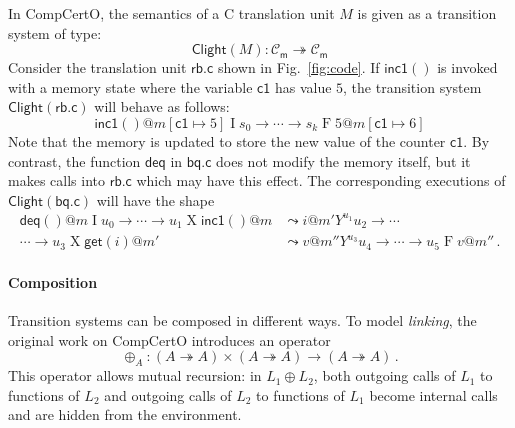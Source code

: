\documentclass[acmsmall,screen,review,anonymous]{acmart}
\newcommand{\kw}[1]{\ensuremath{ \mathsf{#1} }}
\begin{document}
\begin{example} \label{ex:clightsem} %
In CompCertO,
the semantics of a C translation unit $M$
is given as a transition system of type:
\[
  \kw{Clight}(M) : \mathcal{C}_\kw{m} \twoheadrightarrow \mathcal{C}_\kw{m}
\]
%
Consider the translation unit $\kw{rb.c}$ shown in Fig.~\ref{fig:code}.
If $\kw{inc1}()$ is invoked
with a memory state where the variable $\kw{c1}$ has value $5$,
the transition system $\kw{Clight}(\kw{rb.c})$ will behave as follows:
\[
  \kw{inc1}()@m[\kw{c1} \mapsto 5]
  \mathrel{I}
  s_0 \rightarrow \cdots \rightarrow s_k
  \mathrel{F}
  5@m[\kw{c1} \mapsto 6]
\]
Note that the memory is updated to store the new value of the counter $\kw{c1}$.
By contrast, the function $\kw{deq}$ in $\kw{bq.c}$
does not modify the memory itself,
but it makes calls into $\kw{rb.c}$ which may have this effect.
The corresponding executions of $\kw{Clight}(\kw{bq.c})$
will have the shape
\begin{align*}
  \kw{deq}()@m
  \mathrel{I}
  u_0 \rightarrow \cdots \rightarrow u_1
  \mathrel{X}
  \kw{inc1}()@m &\leadsto i@m'
  \mathrel{Y^{u_1}}
  u_2 \rightarrow \cdots \\ \cdots \rightarrow u_3
  \mathrel{X}
  \kw{get}(i)@m' &\leadsto v@m''
  \mathrel{Y^{u_3}}
  u_4 \rightarrow \cdots \rightarrow u_5
  \mathrel{F}
  v@m''
  \,.
\end{align*}
\end{example}

\paragraph{Composition} %

Transition systems can be composed in different ways.
To model \emph{linking}, the original work on CompCertO introduces an operator
\[
  {\oplus}_A : (A \twoheadrightarrow A) \times (A \twoheadrightarrow A)
  \rightarrow (A \twoheadrightarrow A)
  \,.
\]
This operator allows mutual recursion:
in $L_1 \oplus L_2$, both
outgoing calls of $L_1$ to functions of $L_2$ and
outgoing calls of $L_2$ to functions of $L_1$
become internal calls and are hidden from the environment.
\end{document}
